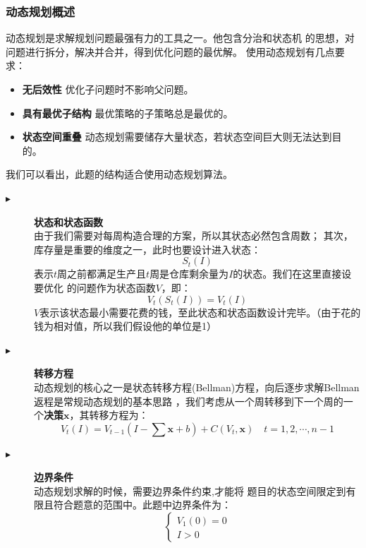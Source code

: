 \documentclass{cumcmthesis}
\begin{document}
\subsubsection*{动态规划概述}
动态规划是求解规划问题最强有力的工具之一。他包含分治和状态机
的思想，对问题进行拆分，解决并合并，得到优化问题的最优解。
使用动态规划有几点要求：
\begin{itemize}
    \item \textbf{无后效性} \quad 优化子问题时不影响父问题。
    \item \textbf{具有最优子结构} \quad 最优策略的子策略总是最优的。
    \item \textbf{状态空间重叠} \quad 动态规划需要储存大量状态，若状态空间巨大则无法达到目的。
\end{itemize}
我们可以看出，此题的结构适合使用动态规划算法。\par
\begin{description}
    \item[$\blacktriangleright$] \textbf{状态和状态函数} \\
        由于我们需要对每周构造合理的方案，所以其状态必然包含周数；
        其次，库存量是重要的维度之一，此时也要设计进入状态：
        $$
            S_t(I)
        $$
        表示$t$周之前都满足生产且$t$周是仓库剩余量为$I$的状态。我们在这里直接设要优化
        的问题作为状态函数$V$，即：
        $$
            V_t(S_t(I)) = V_t(I)
        $$
        $V$表示该状态最小需要花费的钱，至此状态和状态函数设计完毕。（由于花的钱为相对值，所以我们假设他的单位是1）
    \item[$\blacktriangleright$] \textbf{转移方程} \\
        动态规划的核心之一是状态转移方程(Bellman)方程，向后逐步求解Bellman返程是常规动态规划的基本思路
        ，我们考虑从一个周转移到下一个周的一个\textbf{决策}$\bm{x}$，其转移方程为：
        \begin{equation}
            V_t(I) = V_{t-1}(I - \sum \bm{x} + b) + C(V_t,\bm{x}) \quad t = 1,2,\cdots , n-1
            \label{状态转移方程}
        \end{equation}
    \item[$\blacktriangleright$] \textbf{边界条件} \\
        动态规划求解的时候，需要边界条件约束,才能将
        题目的状态空间限定到有限且符合题意的范围中。此题中边界条件为：
        $$
            \left\{
            \begin{aligned}
                V_1(0) = 0 \\
                I > 0
            \end{aligned}
            \right.
        $$
\end{description}
\end{document}
